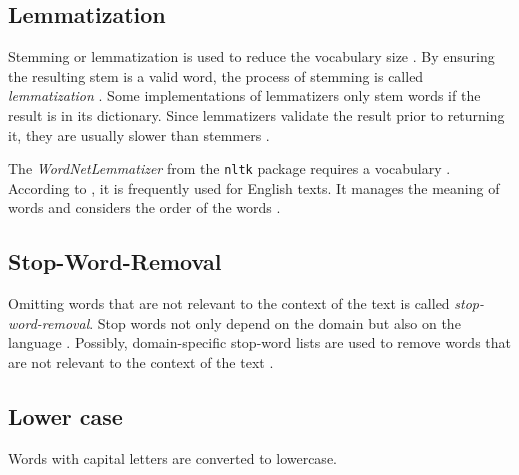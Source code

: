 \subsection{Lemmatization}\label{subsec:lemmatization}

Stemming or lemmatization is used to reduce the vocabulary size \cite{clusteringDocs2020}.
By ensuring the resulting stem is a valid word, the process of stemming is called \textit{lemmatization} \cite{nlp-book2009}.
Some implementations of lemmatizers only stem words if the result is in its dictionary.
Since lemmatizers validate the result prior to returning it, they are usually slower than stemmers \cite{nlp-book2009}.

The \textit{WordNetLemmatizer} from the \texttt{nltk} package requires a vocabulary \cite{clusteringDocs2020}.
According to \citeauthor{clusteringDocs2020}, it is frequently used for English texts.
It manages the meaning of words and considers the order of the words \cite{clusteringDocs2020}.


\subsection{Stop-Word-Removal}\label{subsec:stop-word-removal}

Omitting words that are not relevant to the context of the text is called \textit{stop-word-removal}.
Stop words not only depend on the domain but also on the language \cite{IR2011}.
Possibly, domain-specific stop-word lists are used to remove words that are not relevant to the context of the text \cite{IR2011}.



\subsection{Lower case}\label{subsec:lower-case}

Words with capital letters are converted to lowercase.